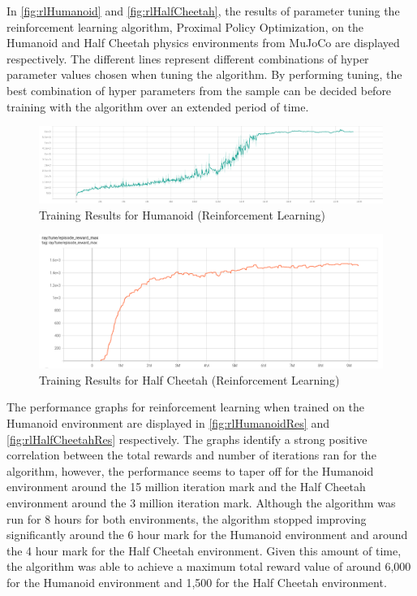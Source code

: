 \documentclass{article}
\begin{document}
    In \autoref{fig:rlHumanoid} and \autoref{fig:rlHalfCheetah}, the results of parameter tuning the reinforcement learning algorithm, Proximal Policy Optimization, on the Humanoid and Half Cheetah physics environments from MuJoCo are displayed respectively. The different lines represent different combinations of hyper parameter values chosen when tuning the algorithm. By performing tuning, the best combination of hyper parameters from the sample can be decided before training with the algorithm over an extended period of time.
    
\begin{figure}
    \centerline{\includegraphics[scale=0.3]{best_humanoid.png}}        
    \caption{Training Results for Humanoid (Reinforcement Learning)}
    \label{fig:rlHumanoidRes}
\end{figure}
\begin{figure}
    \centerline{\includegraphics[scale=0.3]{best_halfcheetah.png}}        
    \caption{Training Results for Half Cheetah (Reinforcement Learning)}
    \label{fig:rlHalfCheetahRes}
\end{figure}
    The performance graphs for reinforcement learning when trained on the Humanoid environment are displayed in \autoref{fig:rlHumanoidRes} and \autoref{fig:rlHalfCheetahRes} respectively. The graphs identify a strong positive correlation between the total rewards and number of iterations ran for the algorithm, however, the performance seems to taper off for the Humanoid environment around the 15 million iteration mark and the Half Cheetah environment around the 3 million iteration mark. Although the algorithm was run for 8 hours for both environments, the algorithm stopped improving significantly around the 6 hour mark for the Humanoid environment and around the 4 hour mark for the Half Cheetah environment. Given this amount of time, the algorithm was able to achieve a maximum total reward value of around 6,000 for the Humanoid environment and 1,500 for the Half Cheetah environment.
    
\end{document}
